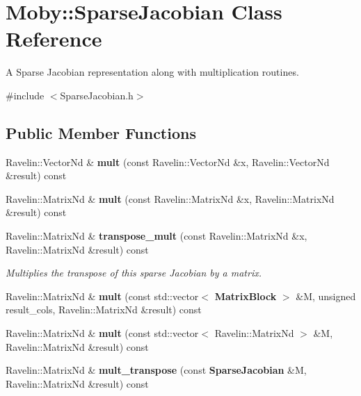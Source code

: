 \section{Moby\-:\-:Sparse\-Jacobian Class Reference}
\label{classMoby_1_1SparseJacobian}


A Sparse Jacobian representation along with multiplication routines.  




{\ttfamily \#include $<$Sparse\-Jacobian.\-h$>$}

\subsection*{Public Member Functions}
\begin{DoxyCompactItemize}
\item 
Ravelin\-::\-Vector\-Nd \& {\bfseries mult} (const Ravelin\-::\-Vector\-Nd \&x, Ravelin\-::\-Vector\-Nd \&result) const \label{classMoby_1_1SparseJacobian_a2b1aa47ef0bbeec1929893fabf123bae}

\item 
Ravelin\-::\-Matrix\-Nd \& {\bfseries mult} (const Ravelin\-::\-Matrix\-Nd \&x, Ravelin\-::\-Matrix\-Nd \&result) const \label{classMoby_1_1SparseJacobian_a7e635a806c0446adea1c239fa4242339}

\item 
Ravelin\-::\-Matrix\-Nd \& {\bf transpose\-\_\-mult} (const Ravelin\-::\-Matrix\-Nd \&x, Ravelin\-::\-Matrix\-Nd \&result) const \label{classMoby_1_1SparseJacobian_a9c3ae8255c2125855fe0af74a5e4703d}

\begin{DoxyCompactList}\small\item\em Multiplies the transpose of this sparse Jacobian by a matrix. \end{DoxyCompactList}\item 
Ravelin\-::\-Matrix\-Nd \& {\bfseries mult} (const std\-::vector$<$ {\bf Matrix\-Block} $>$ \&M, unsigned result\-\_\-cols, Ravelin\-::\-Matrix\-Nd \&result) const \label{classMoby_1_1SparseJacobian_ad8fcddbb89a88fef95521b08eff2d650}

\item 
Ravelin\-::\-Matrix\-Nd \& {\bfseries mult} (const std\-::vector$<$ Ravelin\-::\-Matrix\-Nd $>$ \&M, Ravelin\-::\-Matrix\-Nd \&result) const \label{classMoby_1_1SparseJacobian_aa4c84db851ed6e9f2156f680a35dc616}

\item 
Ravelin\-::\-Matrix\-Nd \& {\bf mult\-\_\-transpose} (const {\bf Sparse\-Jacobian} \&M, Ravelin\-::\-Matrix\-Nd \&result) const \label{classMoby_1_1SparseJacobian_af8e6586d8a2ae78ae8970c00e710e84b}


\end{DoxyCompactItemize}
